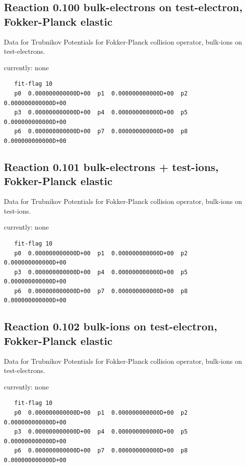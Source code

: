 \documentclass[12pt,dvips]{article}
\begin{document}
\newpage

\subsection{
Reaction 0.100  bulk-electrons on test-electron, Fokker-Planck elastic }
Data for Trubnikov Potentials for Fokker-Planck collision
operator, bulk-ions on test-electrons.

currently: none


\begin{small}\begin{verbatim}
   fit-flag 10
   p0  0.000000000000D+00  p1  0.000000000000D+00  p2  0.000000000000D+00
   p3  0.000000000000D+00  p4  0.000000000000D+00  p5  0.000000000000D+00
   p6  0.000000000000D+00  p7  0.000000000000D+00  p8  0.000000000000D+00
\end{verbatim}\end{small}

\subsection{
Reaction 0.101   bulk-electrons + test-ions, Fokker-Planck elastic }
Data for Trubnikov Potentials for Fokker-Planck collision
operator, bulk-ions on test-ions.

currently: none


\begin{small}\begin{verbatim}
   fit-flag 10
   p0  0.000000000000D+00  p1  0.000000000000D+00  p2  0.000000000000D+00
   p3  0.000000000000D+00  p4  0.000000000000D+00  p5  0.000000000000D+00
   p6  0.000000000000D+00  p7  0.000000000000D+00  p8  0.000000000000D+00
\end{verbatim}\end{small}

\subsection{
Reaction 0.102   bulk-ions on test-electron, Fokker-Planck elastic }
Data for Trubnikov Potentials for Fokker-Planck collision
operator, bulk-ions on test-electrons.


currently: none

\begin{small}\begin{verbatim}
   fit-flag 10
   p0  0.000000000000D+00  p1  0.000000000000D+00  p2  0.000000000000D+00
   p3  0.000000000000D+00  p4  0.000000000000D+00  p5  0.000000000000D+00
   p6  0.000000000000D+00  p7  0.000000000000D+00  p8  0.000000000000D+00
\end{verbatim}\end{small}
\end{document}
